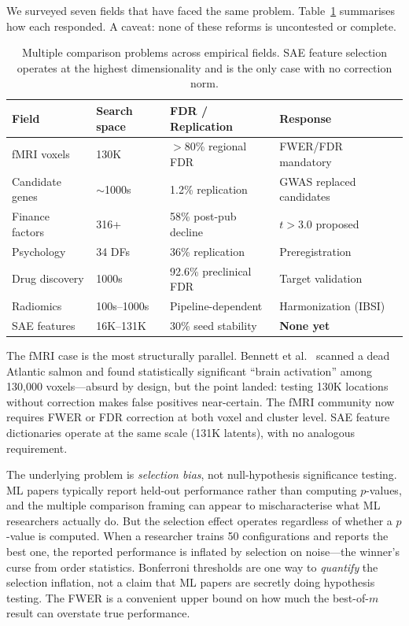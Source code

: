 \documentclass{article}
\begin{document}
We surveyed seven fields that have faced the same problem. Table~\ref{tab:cross_field} summarises how each responded. A caveat: none of these reforms is uncontested or complete.

\begin{table}[t]
\centering
\caption{Multiple comparison problems across empirical fields. SAE feature selection operates at the highest dimensionality and is the only case with no correction norm.}
\label{tab:cross_field}
\small
\begin{tabular}{@{}llll@{}}
\toprule
\textbf{Field} & \textbf{Search space} & \textbf{FDR / Replication} & \textbf{Response} \\
\midrule
fMRI voxels & 130K & $>$80\% regional FDR & FWER/FDR mandatory \\
Candidate genes & $\sim$1000s & 1.2\% replication & GWAS replaced candidates \\
Finance factors & 316+ & 58\% post-pub decline & $t > 3.0$ proposed \\
Psychology & 34 DFs & 36\% replication & Preregistration \\
Drug discovery & 1000s & 92.6\% preclinical FDR & Target validation \\
Radiomics & 100s--1000s & Pipeline-dependent & Harmonization (IBSI) \\
SAE features & 16K--131K & 30\% seed stability & \textbf{None yet} \\
\bottomrule
\end{tabular}
\end{table}

The fMRI case is the most structurally parallel. Bennett et al.~\citep{bennett_dead_salmon_2010} scanned a dead Atlantic salmon and found statistically significant ``brain activation'' among 130,000 voxels---absurd by design, but the point landed: testing 130K locations without correction makes false positives near-certain. The fMRI community now requires FWER or FDR correction at both voxel and cluster level. SAE feature dictionaries operate at the same scale (131K latents), with no analogous requirement.

The underlying problem is \textit{selection bias}, not null-hypothesis significance testing. ML papers typically report held-out performance rather than computing $p$-values, and the multiple comparison framing can appear to mischaracterise what ML researchers actually do. But the selection effect operates regardless of whether a $p$-value is computed. When a researcher trains 50 configurations and reports the best one, the reported performance is inflated by selection on noise---the winner's curse from order statistics. Bonferroni thresholds are one way to \textit{quantify} the selection inflation, not a claim that ML papers are secretly doing hypothesis testing. The FWER is a convenient upper bound on how much the best-of-$m$ result can overstate true performance.
\end{document}
